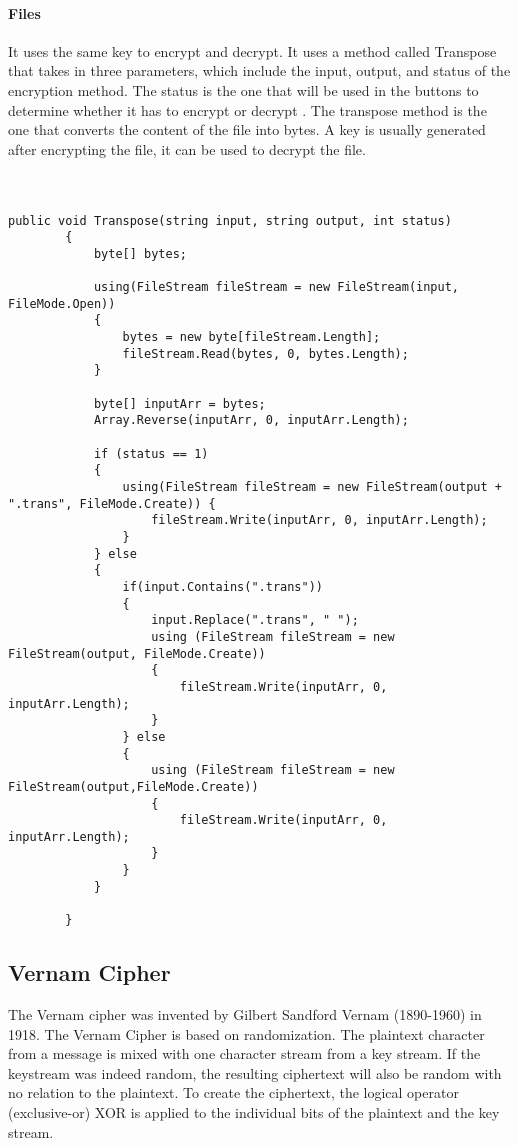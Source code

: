 \paragraph{Files\\}
It uses the same key to encrypt and decrypt. It uses a method called Transpose that takes in three parameters, which include the input, output, and status of the encryption method. The status is the one that will be used in the buttons to determine whether it has to encrypt or decrypt . The transpose method is the one that converts the content of the file into bytes. A key is usually generated after encrypting the file, it can be used to decrypt the file.\\
\\
\\

\begin{lstlisting}[caption=Transposition Cipher File Source Code]
public void Transpose(string input, string output, int status)
        {
            byte[] bytes;

            using(FileStream fileStream = new FileStream(input, FileMode.Open))
            {
                bytes = new byte[fileStream.Length];
                fileStream.Read(bytes, 0, bytes.Length);    
            }

            byte[] inputArr = bytes;
            Array.Reverse(inputArr, 0, inputArr.Length);

            if (status == 1)
            {
                using(FileStream fileStream = new FileStream(output + ".trans", FileMode.Create)) {
                    fileStream.Write(inputArr, 0, inputArr.Length);
                }
            } else
            {
                if(input.Contains(".trans"))
                {
                    input.Replace(".trans", " ");
                    using (FileStream fileStream = new FileStream(output, FileMode.Create))
                    {
                        fileStream.Write(inputArr, 0, inputArr.Length);
                    } 
                } else
                {
                    using (FileStream fileStream = new FileStream(output,FileMode.Create))
                    {
                        fileStream.Write(inputArr, 0, inputArr.Length);
                    }
                }
            }

        }
\end{lstlisting}

\subsection{Vernam Cipher}
The Vernam cipher was invented by Gilbert Sandford Vernam (1890-1960) in 1918. The Vernam Cipher is based on randomization. The plaintext character from a message is mixed with one character stream from a key stream. If the keystream was indeed random, the resulting ciphertext will also be random with no relation to the plaintext. To create the ciphertext, the logical operator (exclusive-or) XOR is applied to the individual bits of the plaintext and the key stream.

